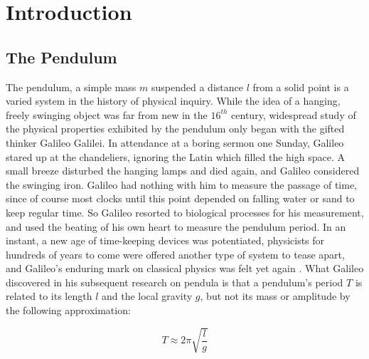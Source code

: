 \documentclass[12pt,twoside]{reedthesis}
\begin{document}
  \mainmatter %
  \pagestyle{fancyplain} %


    \chapter*{Introduction}





\section{The Pendulum}
The pendulum, a simple mass $m$ suspended a distance $l$ from a solid point is a varied system in the history of physical inquiry.  While the idea of a hanging, freely swinging object was far from new in the $16^{th}$ century, widespread study of the physical properties exhibited by the pendulum only began with the gifted thinker Galileo Galilei. 
	In attendance at a boring sermon one Sunday, Galileo stared up at the chandeliers, ignoring the Latin which filled the high space.  A small breeze disturbed the hanging lamps and died again, and Galileo considered the swinging iron.  Galileo had nothing with him to measure the passage of time, since of course most clocks until this point depended on falling water or sand to keep regular time.  So Galileo resorted to biological processes for his measurement, and used the beating of his own heart to measure the pendulum period.   In an instant, a new age of time-keeping devices was potentiated, physicists for hundreds of years to come were offered another type of system to tease apart, and Galileo's enduring mark on classical physics was felt yet again \cite{murdin2009}.  
	What Galileo discovered in his subsequent research on pendula is that a pendulum's period $T$ is related to its length $l$ and the local gravity $g$, but not its mass or amplitude by the following approximation:

\begin{equation}
\label{pundulum_period}
T \approx 2 \pi \sqrt{\frac{l}{g}} \tag{0.1}
\end{equation}
\end{document}
